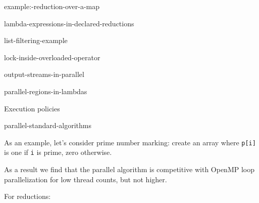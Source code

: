 
\begin{block}{example:-reduction-over-a-map}
    
\end{block}

\begin{block}{lambda-expressions-in-declared-reductions}
    
\end{block}

\begin{block}{list-filtering-example}
    
\end{block}

\begin{block}{lock-inside-overloaded-operator}
    
\end{block}

\begin{block}{output-streams-in-parallel}
    
\end{block}

\begin{block}{parallel-regions-in-lambdas}
    
\end{block}

 {Execution policies}

\begin{block}{parallel-standard-algorithms}
    
\end{block}

As an example, let's consider prime number marking:
create an array where \lstinline{p[i]} is one
if \lstinline{i} is prime, zero otherwise.


As a result we find that the parallel algorithm
is competitive with OpenMP loop parallelization
for low thread counts, but not higher.



For reductions:


